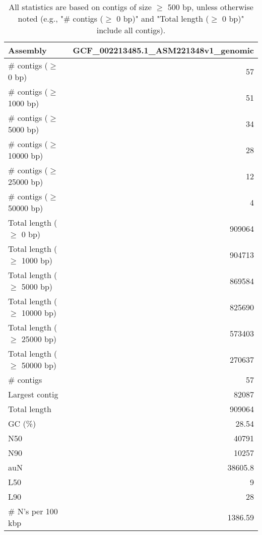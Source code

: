 \documentclass[12pt,a4paper]{article}
\begin{document}
\begin{table}[ht]
\begin{center}
\caption{All statistics are based on contigs of size $\geq$ 500 bp, unless otherwise noted (e.g., "\# contigs ($\geq$ 0 bp)" and "Total length ($\geq$ 0 bp)" include all contigs).}
\begin{tabular}{|l*{1}{|r}|}
\hline
Assembly & GCF\_002213485.1\_ASM221348v1\_genomic \\ \hline
\# contigs ($\geq$ 0 bp) & 57 \\ \hline
\# contigs ($\geq$ 1000 bp) & 51 \\ \hline
\# contigs ($\geq$ 5000 bp) & 34 \\ \hline
\# contigs ($\geq$ 10000 bp) & 28 \\ \hline
\# contigs ($\geq$ 25000 bp) & 12 \\ \hline
\# contigs ($\geq$ 50000 bp) & 4 \\ \hline
Total length ($\geq$ 0 bp) & 909064 \\ \hline
Total length ($\geq$ 1000 bp) & 904713 \\ \hline
Total length ($\geq$ 5000 bp) & 869584 \\ \hline
Total length ($\geq$ 10000 bp) & 825690 \\ \hline
Total length ($\geq$ 25000 bp) & 573403 \\ \hline
Total length ($\geq$ 50000 bp) & 270637 \\ \hline
\# contigs & 57 \\ \hline
Largest contig & 82087 \\ \hline
Total length & 909064 \\ \hline
GC (\%) & 28.54 \\ \hline
N50 & 40791 \\ \hline
N90 & 10257 \\ \hline
auN & 38605.8 \\ \hline
L50 & 9 \\ \hline
L90 & 28 \\ \hline
\# N's per 100 kbp & 1386.59 \\ \hline
\end{tabular}
\end{center}
\end{table}
\end{document}
